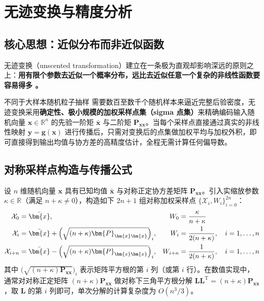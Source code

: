 \section{无迹变换与精度分析}\label{sec:ut}

\subsection{核心思想：近似分布而非近似函数}\label{sec:ut-philosophy}

无迹变换（unscented transformation）建立在一条极为直观却影响深远的原则之上：\textbf{用有限个参数去近似一个概率分布，远比去近似任意一个复杂的非线性函数要容易得多 \cite{r04,r08}。}

不同于大样本随机粒子抽样 \cite{r07} 需要数百至数千个随机样本来逼近完整后验密度，无迹变换采用\textbf{确定性、极小规模的加权采样点集（sigma 点集）}来精确编码输入随机向量 $\bm{x} \in \mathbb{R}^n$ 的先验一阶矩 $\bar{\bm{x}}$ 与二阶矩 $\bm{P}_{\bm{x}\bm{x}}$。当每个采样点直接通过真实的非线性映射 $\bm{y} = \bm{g}(\bm{x})$ 进行传播后，只需对变换后的点集做加权平均与加权外积，即可直接得到输出均值与协方差的高精度估计，全程无需计算任何偏导数。

\subsection{对称采样点构造与传播公式}\label{sec:ut-def}

设 $n$ 维随机向量 $\bm{x}$ 具有已知均值 $\bar{\bm{x}}$ 与对称正定协方差矩阵 $\bm{P}_{\bm{x}\bm{x}}$。引入实缩放参数 $\kappa \in \mathbb{R}$（满足 $n + \kappa \neq 0$），构造如下 $2n + 1$ 组对称加权采样点 $\{\mathcal{X}_i, W_i\}_{i=0}^{2n}$：
\begin{equation}\label{eq:7}
\begin{aligned}
\mathcal{X}_0 &= \bar{\bm{x}}, & W_0 &= \frac{\kappa}{n + \kappa} \\
\mathcal{X}_i &= \bar{\bm{x}} + \Bigl(\sqrt{(n + \kappa)\bm{P}_{\bm{x}\bm{x}}}\Bigr)_i, & W_i &= \frac{1}{2(n + \kappa)}, \quad i = 1, \dots, n \\
\mathcal{X}_{i+n} &= \bar{\bm{x}} - \Bigl(\sqrt{(n + \kappa)\bm{P}_{\bm{x}\bm{x}}}\Bigr)_i, & W_{i+n} &= \frac{1}{2(n + \kappa)}, \quad i = 1, \dots, n
\end{aligned}
\end{equation}
其中 $\bigl(\sqrt{(n + \kappa)\bm{P}_{\bm{x}\bm{x}}}\bigr)_i$ 表示矩阵平方根的第 $i$ 列（或第 $i$ 行）。在数值实现中，通常对对称正定矩阵 $(n + \kappa)\bm{P}_{\bm{x}\bm{x}}$ 做对称下三角平方根分解 $\bm{L}\bm{L}^{\mathrm{T}} = (n + \kappa)\bm{P}_{\bm{x}\bm{x}}$，取 $\bm{L}$ 的第 $i$ 列即可，单次分解的计算复杂度为 $O(n^3/3)$。

